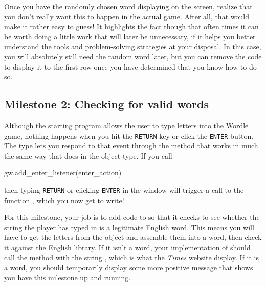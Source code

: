 \documentclass[letterpaper,12pt]{exam}
\begin{document}
Once you have the randomly chosen word displaying on the screen, realize that you don't really want this to happen in the actual game. After all, that would make it rather easy to guess! It highlights the fact though that often times it can be worth doing a little work that will later be unnecessary, if it helps you better understand the tools and problem-solving strategies at your disposal. In this case, you will absolutely still need the random word later, but you can remove the code to display it to the first row once you have determined that you know how to do so.

\subsection{Milestone 2: Checking for valid words}
Although the starting program allows the user to type letters into the Wordle game, nothing happens when you hit the \texttt{RETURN} key or click the \texttt{ENTER} button. The  type lets you respond to that event through the  method that works in much the same way that  does in the  object type. If you call
\begin{pythoncode}[style=syntax]
	gw.add_enter_listener(enter_action)
\end{pythoncode}
then typing \texttt{RETURN} or clicking \texttt{ENTER} in the window will trigger a call to the function , which you now get to write!

For this milestone, your job is to add code to  so that it checks to see whether the string the player has typed in is a legitimate English word. This means you will have to get the letters from the  object and assemble them into a word, then check it against the English library. If it isn't a word, your implementation of  should call the  method with the string , which is what the \emph{Times} website display. If it is a word, you should temporarily display some more positive message that shows you have this milestone up and running.
\end{document}
